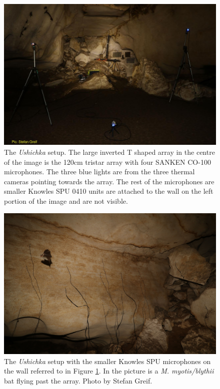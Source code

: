 \documentclass[
]{book}
\begin{document}
\begin{figure}
\centering
\includegraphics{original_papers/ushichka-figures/ushichka_setup_DC6A5930_w.JPG}
\caption{\label{fig:cavesetup}The \emph{Ushichka} setup. The large inverted T shaped array in the centre of the image is the 120cm tristar array with four SANKEN CO-100 microphones. The three blue lights are from the three thermal cameras pointing towards the array. The rest of the microphones are smaller Knowles SPU 0410 units are attached to the wall on the left portion of the image and are not visible.}
\end{figure}

\begin{figure}
\centering
\includegraphics{original_papers/ushichka-figures/DC6A6061.JPG}
\caption{\label{fig:othercavesetup}The \emph{Ushichka} setup with the smaller Knowles SPU microphones on the wall referred to in Figure \ref{fig:cavesetup}. In the picture is a \emph{M. myotis/blythii} bat flying past the array. Photo by Stefan Greif.}
\end{figure}
\end{document}
